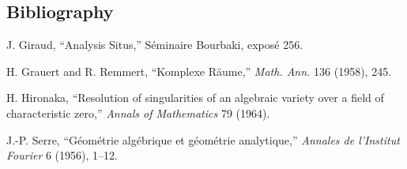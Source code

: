 \subsection*{Bibliography}
\begin{enumerate}[label={[\arabic*]}]
\item J. Giraud, ``Analysis Situs,'' S\'eminaire Bourbaki, expos\'e 256.
\item H. Grauert and R. Remmert, ``Komplexe R\"aume,'' \emph{Math. Ann.} 136 (1958), 245.
\item H. Hironaka, ``Resolution of singularities of an algebraic variety over a field of characteristic zero,'' \emph{Annals of Mathematics} 79 (1964).
\item J.-P. Serre, ``G\'eom\'etrie alg\'ebrique et g\'eom\'etrie analytique,'' \emph{Annales de l'Institut Fourier} 6 (1956), 1--12.
\end{enumerate}
